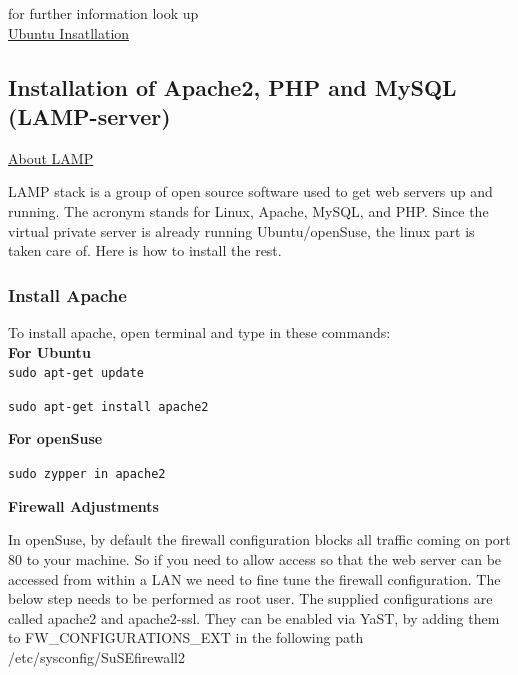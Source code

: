\documentclass[16pt]{article}
\begin{document}
for further information look up \\

{\color{red}\href{https://help.ubuntu.com/community/WindowsDualBoot}{Ubuntu Insatllation}}
  
\hfill


\subsection{Installation of Apache2, PHP and MySQL (LAMP-server)}

\vspace{0.5cm}

{\underline{\Large{About LAMP}}}

  LAMP stack is a group of open source software used to get web servers up
  and running. The acronym stands for Linux, Apache, MySQL, and PHP. Since
  the virtual private server is already running Ubuntu/openSuse, the linux
  part is taken care of. Here is how to install the rest.


  
  

  

  \subsubsection{Install Apache}
  
  \hfill

  To install apache, open terminal and type in these commands: \\
  \textbf{For Ubuntu} \\
  \texttt{sudo apt-get update} 

  \texttt{sudo apt-get install apache2}

  \textbf{For openSuse}

  \texttt{sudo zypper in apache2}

  \textbf{Firewall Adjustments}

  In openSuse, by default the firewall configuration blocks all traffic
  coming on port 80 to your machine. So if you need to allow access so
  that the web server can be accessed from within a LAN we need to fine
  tune the firewall configuration. The below step needs to be performed as
  root user. The supplied configurations are called apache2 and
  apache2-ssl. They can be enabled via YaST, by adding them to
  FW\_CONFIGURATIONS\_EXT in the following path /etc/sysconfig/SuSEfirewall2
  
\end{document}
